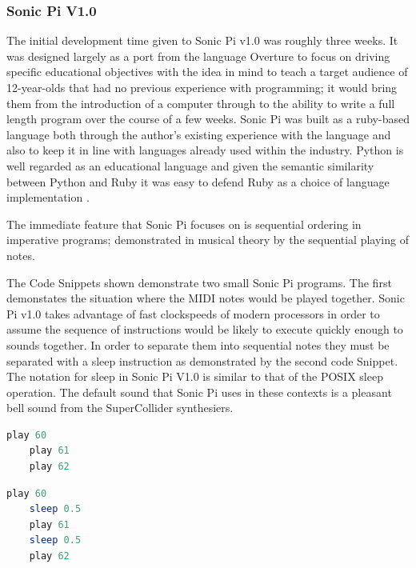 \documentclass[11pt]{scrartcl}
\begin{document}
\subsubsection{Sonic Pi V1.0}
The initial development time given to Sonic Pi v1.0 was roughly three weeks. 
It was designed largely as a port from the language Overture to focus on 
driving specific educational objectives with the idea in mind to teach a 
target audience of 12-year-olds that had no previous experience with 
programming; it would bring them from the introduction of a computer through 
to the ability to write a full length program over the course of a few weeks. 
Sonic Pi was built as a ruby-based language both through the author's existing 
experience with the language and also to keep it in line with languages 
already used within the industry. Python is well regarded as an educational 
language and given the semantic similarity between Python and Ruby it was easy 
to defend Ruby as a choice of language implementation \cite{AB13}. 

The immediate feature that Sonic Pi focuses on is sequential ordering in 
imperative programs; demonstrated in musical theory by the sequential playing 
of notes. 

\begin{multicols}{2}
The Code Snippets shown demonstrate two small Sonic Pi programs. The first 
demonstates the situation where the MIDI notes would be played together. Sonic 
Pi v1.0 takes advantage of fast clockspeeds of modern processors in order to 
assume the sequence of instructions would be likely to execute quickly enough 
to sounds together. In order to separate them into sequential notes they must 
be separated with a sleep instruction as demonstrated by the second code 
Snippet. The notation for sleep in Sonic Pi V1.0 is similar to that of the 
POSIX sleep operation\cite{IG13}. The default sound that Sonic Pi uses in 
these contexts is a pleasant bell sound from the SuperCollider synthesiers.

\begin{minipage}{0.5\textwidth}
	\begin{minipage}[t]{\textwidth}
		\begin{lstlisting}[language = ruby]
	play 60
	play 61
	play 62
		\end{lstlisting}
	\end{minipage}
	\begin{minipage}[t]{\textwidth}
		\begin{lstlisting}[language = ruby]
	play 60
	sleep 0.5
	play 61
	sleep 0.5
	play 62
		\end{lstlisting}
	\end{minipage}
\end{minipage}

\end{multicols}
\end{document}
